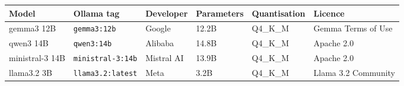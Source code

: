 \begin{tabular}{llllll}
\toprule
Model & Ollama tag & Developer & Parameters & Quantisation & Licence \\
\midrule
gemma3 12B & \texttt{gemma3:12b} & Google & 12.2B & Q4\_K\_M & Gemma Terms of Use \\
qwen3 14B & \texttt{qwen3:14b} & Alibaba & 14.8B & Q4\_K\_M & Apache 2.0 \\
ministral-3 14B & \texttt{ministral-3:14b} & Mistral AI & 13.9B & Q4\_K\_M & Apache 2.0 \\
llama3.2 3B & \texttt{llama3.2:latest} & Meta & 3.2B & Q4\_K\_M & Llama 3.2 Community \\
\bottomrule
\end{tabular}

